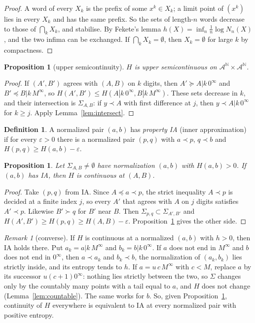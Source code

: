 \documentclass[11pt]{amsart}
\newtheorem{proposition}[theorem]{Proposition}
\theoremstyle{definition}
\newtheorem{definition}[theorem]{Definition}
\theoremstyle{remark}
\newtheorem{remark}[theorem]{Remark}
\newcommand{\N}{\mathbb{N}}
\newcommand{\lex}{\preccurlyeq}
\newcommand{\gex}{\succcurlyeq}
\newcommand{\A}{\mathcal{A}}
\begin{document}
\begin{proof}
A word of every $X_k$ is the prefix of some $x^k\in X_k$; a limit point of $(x^k)$ lies in every $X_k$ and has the same prefix. So the sets of length-$n$ words decrease to those of $\bigcap_kX_k$, and stabilise. By Fekete's lemma $h(X)=\inf_n\frac1n\log N_n(X)$, and the two infima can be exchanged. If $\bigcap_kX_k=\emptyset$, then $X_k=\emptyset$ for large $k$ by compactness.
\end{proof}

\begin{proposition}[upper semicontinuity]\label{prop:usc}
$H$ is upper semicontinuous on $\A^{\N}\times\A^{\N}$.
\end{proposition}

\begin{proof}
If $(A',B')$ agrees with $(A,B)$ on $k$ digits, then $A'\gex A|k\,0^\infty$ and $B'\lex B|k\,M^\infty$, so $H(A',B')\le H(A|k\,0^\infty,B|k\,M^\infty)$. These sets decrease in $k$, and their intersection is $\Sigma_{A,B}$: if $y\prec A$ with first difference at $j$, then $y\prec A|k\,0^\infty$ for $k\ge j$. Apply Lemma~\ref{lem:intersect}.
\end{proof}

\begin{definition}
A normalized pair $(a,b)$ has \emph{property IA} (inner approximation) if for every $\varepsilon>0$ there is a normalized pair $(p,q)$ with $a\prec p$, $q\prec b$ and $H(p,q)\ge H(a,b)-\varepsilon$.
\end{definition}

\begin{proposition}\label{prop:lsc}
Let $\Sigma_{A,B}\ne\emptyset$ have normalization $(a,b)$ with $H(a,b)>0$. If $(a,b)$ has IA, then $H$ is continuous at $(A,B)$.
\end{proposition}

\begin{proof}
Take $(p,q)$ from IA. Since $A\lex a\prec p$, the strict inequality $A\prec p$ is decided at a finite index $j$, so every $A'$ that agrees with $A$ on $j$ digits satisfies $A'\prec p$. Likewise $B'\succ q$ for $B'$ near $B$. Then $\Sigma_{p,q}\subset\Sigma_{A',B'}$ and $H(A',B')\ge H(p,q)\ge H(A,B)-\varepsilon$. Proposition~\ref{prop:usc} gives the other side.
\end{proof}

\begin{remark}[converse]\label{rem:converse}
If $H$ is continuous at a normalized $(a,b)$ with $h>0$, then IA holds there. Put $a_k=a|k\,M^\infty$ and $b_k=b|k\,0^\infty$. If $a$ does not end in $M^\infty$ and $b$ does not end in $0^\infty$, then $a\prec a_k$ and $b_k\prec b$, the normalization of $(a_k,b_k)$ lies strictly inside, and its entropy tends to $h$. If $a=u\,c\,M^\infty$ with $c<M$, replace $a$ by its successor $u(c+1)0^\infty$: nothing lies strictly between the two, so $\Sigma$ changes only by the countably many points with a tail equal to $a$, and $H$ does not change (Lemma~\ref{lem:countable}). The same works for $b$. So, given Proposition~\ref{prop:usc}, continuity of $H$ everywhere is equivalent to IA at every normalized pair with positive entropy.
\end{remark}
\end{document}
